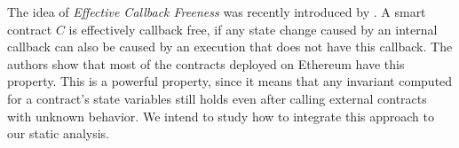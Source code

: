 The idea of \emph{Effective Callback Freeness} was recently introduced by
\cite{Grossman}.
%
A smart contract $C$ is effectively callback free, if any state change caused
by an internal callback can also be caused by an execution that does not have this callback.
%
The authors show that most of the contracts deployed on Ethereum have this
property.
%
This is a powerful property, since it means that any invariant computed for a
contract's state variables still holds even after calling external contracts
with unknown behavior.
%
We intend to study how to integrate this approach to our static analysis.
